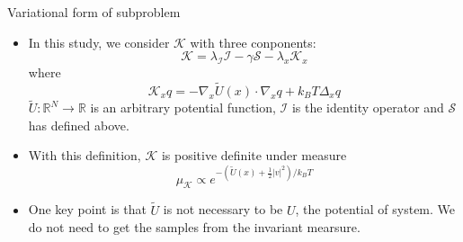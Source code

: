 \documentclass{beamer}
\newcommand{\p}{{\partial}}
\newcommand{\kbt}{k_B T}
\newcommand{\LLL}{\mathcal{L}}
\newcommand{\SSS}{\mathcal{S}}
\newcommand{\KKK}{\mathcal{K}}
\begin{document}
    

\begin{frame}{Variational form of subproblem}
    \begin{itemize}
        \item In this study, we consider $\KKK$ with three conponents:
        $$ \KKK = \lambda_\mathcal{I} \mathcal{I} -\gamma\SSS - \lambda_{x} \KKK_x  $$
        where 
        $$ \KKK_x q = - \nabla_x \tilde{U}(x) \cdot \nabla_x q + \kbt \Delta_x q $$
         $ \tilde{U}:\mathbb{R}^N \to \mathbb{R}$ is an arbitrary potential function, $\mathcal{I}$ is the identity operator and $\SSS$ has defined above.
         \item With this definition, $\KKK$ is positive definite under measure 
         $$\mu_\KKK \propto e^{-(\tilde{U}(x)+\frac{1}{2}|v|^2)/\kbt}$$
         \item One key point is that $\tilde{U}$ is not necessary to  be $U$, the potential of system. We do not need to get the samples from the invariant mearsure.
    \end{itemize}
\end{frame}
\end{document}
